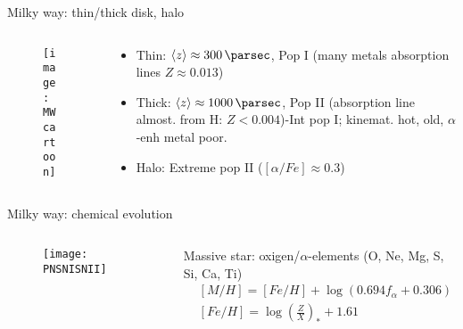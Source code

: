 \begin{frame}{Milky way: thin/thick disk, halo}
\begin{columns}[T]
\begin{column}{0.5\textwidth}
\begin{figure}[!ht]\texttt{[image: MWcartoon]}\label{fig:MWcartoon}\end{figure}
\end{column}
\begin{column}{0.5\textwidth}
\begin{itemize}
\item Thin: $\exv{z}\approx\SI{300}{\parsec}$, Pop I (many metals absorption lines $Z\approx0.013$)
\item Thick: $\exv{z}\approx\SI{1000}{\parsec}$, Pop II (absorption line almost. from H: $Z<0.004$)-Int pop I; kinemat. hot, old, $\alpha$-enh metal poor.
\item Halo: Extreme pop II ($[\alpha/Fe]\approx0.3$)
\end{itemize}
\end{column}
\end{columns}
\end{frame}

\begin{frame}{Milky way: chemical evolution}
\begin{columns}[T]
\begin{column}{0.5\textwidth}
\begin{figure}[!ht]\texttt{[image: PNSNISNII]}\label{fig:PNSNISNII}
\end{figure}
\end{column}
\begin{column}{0.5\textwidth}
Massive star: oxigen/$\alpha$-elements (O, Ne, Mg, S, Si, Ca, Ti)
\begin{align*}
&[M/H]=[Fe/H]+\log{(0.694f_{\alpha}+0.306)}\\
&[Fe/H]=\log{(\frac{Z}{X})_*}+1.61
\end{align*}
\end{column}
\end{columns}
\end{frame}

